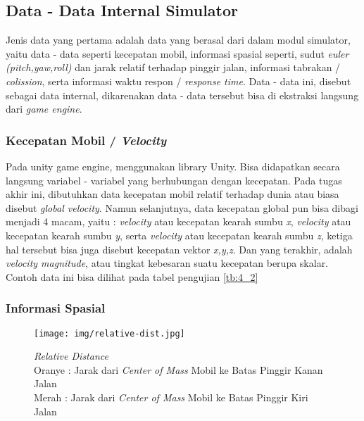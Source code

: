     \subsection{Data - Data Internal Simulator}
    \vspace{1ex}
    Jenis data yang pertama adalah data yang berasal dari dalam modul simulator, yaitu data - data seperti kecepatan mobil, informasi spasial seperti, sudut \textit{euler} \textit{(pitch,yaw,roll)} dan jarak relatif terhadap pinggir jalan, informasi tabrakan / \textit{colission}, serta informasi waktu respon / \textit{response time}. Data - data ini, disebut sebagai data internal, dikarenakan data - data tersebut bisa di ekstraksi langsung dari \textit{game engine}.
    
        \subsubsection{Kecepatan Mobil / \textit{Velocity}}
        
        Pada unity game engine, menggunakan library Unity. Bisa didapatkan secara langsung variabel - variabel yang berhubungan dengan kecepatan. Pada tugas akhir ini, dibutuhkan data kecepatan mobil relatif terhadap dunia atau biasa disebut \textit{global velocity}. Namun selanjutnya, data kecepatan global pun bisa dibagi menjadi 4 macam, yaitu : \textit{velocity} atau kecepatan kearah sumbu \textit{x}, \textit{velocity} atau kecepatan kearah sumbu \textit{y}, serta \textit{velocity} atau kecepatan kearah sumbu \textit{z}, ketiga hal tersebut bisa juga disebut kecepatan vektor \textit{x,y,z}. Dan yang terakhir, adalah \textit{velocity magnitude}, atau tingkat kebesaran suatu kecepatan berupa skalar. Contoh data ini bisa dilihat pada tabel pengujian \ref{tb:4_2}
        
        \subsubsection{Informasi Spasial}
        
        \begin{figure}  [!htb]
	        \captionsetup{justification=centering}
	        \texttt{[image: img/relative-dist.jpg]}
	        \caption{\textit{Relative Distance} \\ Oranye : Jarak dari \textit{Center of Mass} Mobil ke Batas Pinggir Kanan Jalan \\ Merah : Jarak dari \textit{Center of Mass} Mobil ke Batas Pinggir Kiri Jalan}
	        \label{fig: 3_19}
        \end{figure}
        
